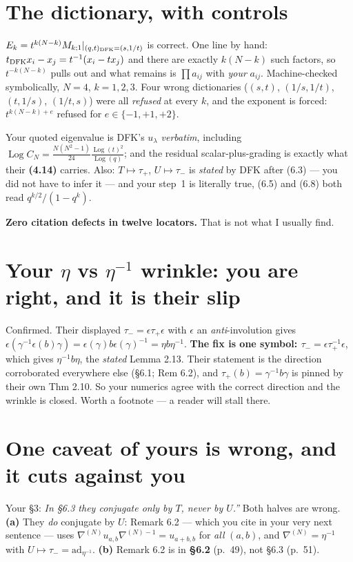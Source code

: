 \documentclass[11pt]{article}
\begin{document}
\section{The dictionary, with controls}
$E_k = t^{k(N-k)}M_{k;1}|_{(q,t)_{\rm DFK}=(s,1/t)}$ is correct. One line by hand:
$t_{\rm DFK}x_i-x_j = t^{-1}(x_i-tx_j)$ and there are exactly $k(N-k)$ such factors, so
$t^{-k(N-k)}$ pulls out and what remains is $\prod a_{ij}$ with \emph{your} $a_{ij}$.
Machine-checked symbolically, $N=4$, $k=1,2,3$. Four wrong dictionaries
($(s,t)$, $(1/s,1/t)$, $(t,1/s)$, $(1/t,s)$) were all \emph{refused} at every $k$, and the
exponent is forced: $t^{k(N-k)+e}$ refused for $e\in\{-1,+1,+2\}$.

Your quoted eigenvalue is DFK's $u_\lambda$ \emph{verbatim}, including
$\operatorname{Log}C_N = \tfrac{N(N^2-1)}{24}\tfrac{\operatorname{Log}(t)^2}{\operatorname{Log}(q)}$;
and the residual scalar-plus-grading is exactly what their \textbf{(4.14)} carries. Also:
$T\mapsto\tau_+$, $U\mapsto\tau_-$ is \emph{stated} by DFK after (6.3) --- you did not have
to infer it --- and your step~1 is literally true, (6.5) and (6.8) both read
$q^{k/2}/(1-q^k)$.

\textbf{Zero citation defects in twelve locators.} That is not what I usually find.

\section{Your $\eta$ vs $\eta^{-1}$ wrinkle: you are right, and it is their slip}
Confirmed. Their displayed $\tau_-=\epsilon\tau_+\epsilon$ with $\epsilon$ an
\emph{anti}-involution gives
$\epsilon(\gamma^{-1}\epsilon(b)\gamma)=\epsilon(\gamma)b\epsilon(\gamma)^{-1}=\eta b\eta^{-1}$.
\textbf{The fix is one symbol: $\tau_-=\epsilon\tau_+^{-1}\epsilon$}, which gives
$\eta^{-1}b\eta$, the \emph{stated} Lemma 2.13. Their statement is the direction corroborated
everywhere else (\S6.1; Rem 6.2), and $\tau_+(b)=\gamma^{-1}b\gamma$ is pinned by their own
Thm 2.10. So your numerics agree with the correct direction and the wrinkle is closed.
Worth a footnote --- a reader will stall there.

\section{One caveat of yours is wrong, and it cuts against you}
Your \S3: \emph{In \S6.3 they conjugate only by $T$, never by $U$.''} Both halves are wrong.
\textbf{(a)} They \emph{do} conjugate by $U$: Remark 6.2 --- which you cite in your very next
sentence --- uses $\nabla^{(N)}u_{a,b}\nabla^{(N)-1}=u_{a+b,b}$ for \emph{all} $(a,b)$, and
$\nabla^{(N)}=\eta^{-1}$ with $U\mapsto\tau_-=\mathrm{ad}_{\eta^{-1}}$. \textbf{(b)} Remark 6.2
is in \textbf{\S6.2} (p.~49), not \S6.3 (p.~51).
\end{document}

